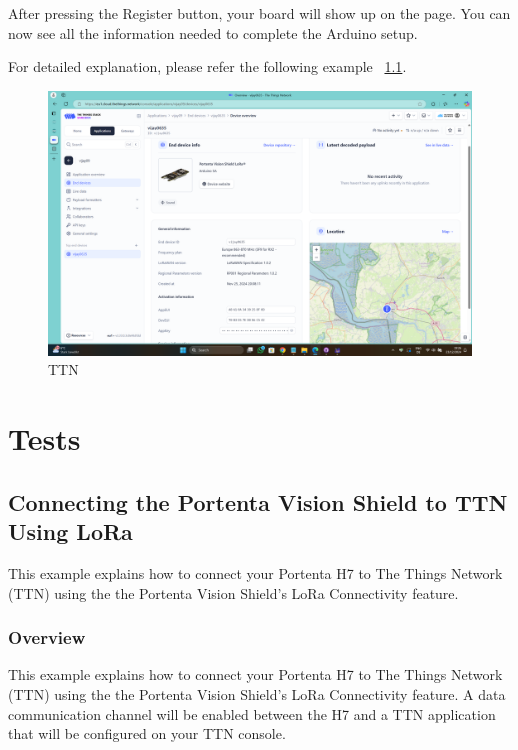 \begin{itemize}
		After pressing the Register button, your board will show up on the  page. You can now see all the information needed to complete the Arduino setup. \cite{ArduinoTTN:2024}
		
		For detailed explanation, please refer the following example ~\ref{LORAWAN}.
		
		\begin{figure}
			\begin{center}
				\includegraphics[width=0.7\linewidth]{Images/LORA/TTN.png}
				\caption{TTN}
				\label{TTN} 
			\end{center}
		\end{figure}




\section{Tests}

\subsection{Connecting the Portenta Vision Shield to TTN Using LoRa}
\label{LORAWAN}
This example explains how to connect your Portenta H7 to The Things Network (TTN) using the the Portenta Vision Shield's LoRa Connectivity feature. \cite{ArduinoTTN:2024}

\subsubsection{Overview}
This example explains how to connect your Portenta H7 to The Things Network (TTN) using the the Portenta Vision Shield's LoRa Connectivity feature. A data communication channel will be enabled between the H7 and a TTN application that will be configured on your TTN console. \cite{ArduinoTTN:2024}

\end{itemize}
